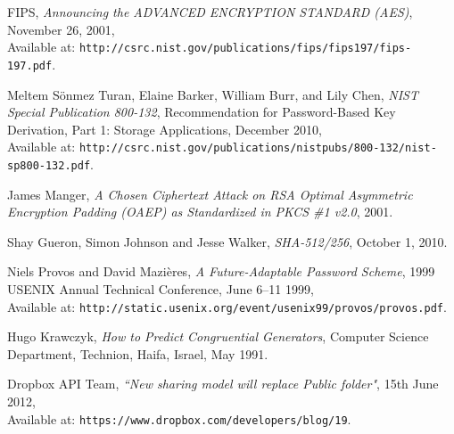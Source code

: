 \documentclass[12pt, titlepage]{article}
\begin{document}
\begin{thebibliography}{10}
FIPS, \emph{Announcing the ADVANCED ENCRYPTION STANDARD (AES)}, November 26, 2001,
\\ Available at:
\texttt{http://csrc.nist.gov/publications/fips/fips197/fips-197.pdf}.

Meltem Sönmez Turan, Elaine Barker, William Burr, and Lily Chen, \emph{NIST Special Publication 800-132}, Recommendation for Password-Based Key Derivation, Part 1: Storage Applications, December 2010,
\\ Available at: \texttt{http://csrc.nist.gov/publications/nistpubs/800-132/nist-sp800-132.pdf}.

James Manger, \emph{A Chosen Ciphertext Attack on RSA Optimal Asymmetric Encryption Padding (OAEP) as Standardized in PKCS \#1 v2.0}, 2001.

Shay Gueron, Simon Johnson and Jesse Walker, \emph{SHA-512/256}, October 1, 2010.

Niels Provos and David Mazières, \emph{A Future-Adaptable Password Scheme}, 1999 USENIX Annual Technical Conference, June 6–11 1999,
\\ Available at: \texttt{http://static.usenix.org/event/usenix99/provos/provos.pdf}. 

Hugo Krawczyk, \emph{How to Predict Congruential Generators}, Computer Science Department, Technion, Haifa, Israel, May 1991. 

Dropbox API Team, \emph{``New sharing model will replace Public folder"},  15th June 2012,
\\ Available at: \texttt{https://www.dropbox.com/developers/blog/19}.

\end{thebibliography}
\end{document}
